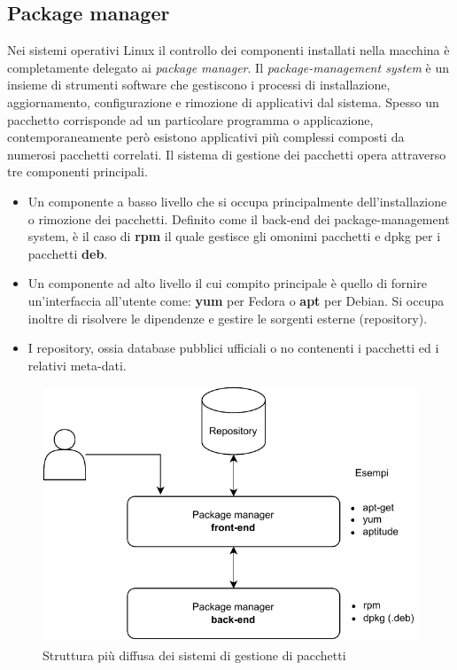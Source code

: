 \subsection{Package manager}

Nei sistemi operativi Linux il controllo dei componenti installati nella macchina è completamente delegato ai \textit{package manager}. Il \textit{package-management system} è un insieme di strumenti software che gestiscono i processi di installazione, aggiornamento, configurazione e rimozione di applicativi dal sistema. Spesso un pacchetto corrisponde ad un particolare programma o applicazione, contemporaneamente però esistono applicativi più complessi composti da numerosi pacchetti correlati. Il sistema di gestione dei pacchetti opera attraverso tre componenti principali.

\begin{itemize}
	\item Un componente a basso livello che si occupa principalmente dell'installazione o rimozione dei pacchetti. Definito come il back-end dei package-management system, è il caso di \textbf{rpm} il quale gestisce gli omonimi pacchetti e dpkg per i pacchetti \textbf{deb}.
	\item Un componente ad alto livello il cui compito principale è quello di fornire un'interfaccia all'utente come: \textbf{yum} per Fedora o \textbf{apt} per Debian. Si occupa inoltre di risolvere le dipendenze e gestire le sorgenti esterne (repository).
	\item I repository, ossia database pubblici ufficiali o no contenenti i pacchetti ed i relativi meta-dati.
\end{itemize}

\begin{figure}[H]
	\centering
	\includegraphics[width=.7\linewidth]{figures/package-managers.pdf}
	\caption{Struttura più diffusa dei sistemi di gestione di pacchetti}
	\label{fig:package-managers}
\end{figure}

